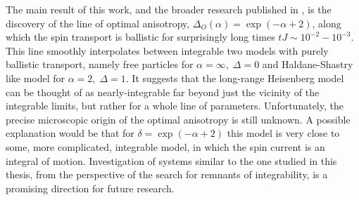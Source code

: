 The main result of this work, and the broader research published in \autocite{Mierzejewski2023}, is the
discovery of the line of optimal anisotropy, \(\Delta_{O}(\alpha) = \exp(-\alpha +2)\),
along which the spin transport is ballistic for surprisingly long times \(tJ \sim 10^{-2} -10^{-3}\).
This line smoothly interpolates between integrable two models with purely ballistic
transport, namely free particles for \(\alpha =\infty,\; \Delta =0\) and Haldane-Shastry
like model for \(\alpha  = 2,\; \Delta  = 1\). It suggests that the long-range Heisenberg
model can be thought of as nearly-integrable far beyond just the vicinity of the
integrable limits, but rather for a whole line of parameters. Unfortunately, the precise
microscopic origin of the optimal anisotropy is still unknown. A possible explanation
would be that for \(\delta = \exp(-\alpha  + 2)\) this model is very close to some,
more complicated, integrable model, in which the spin current is an integral of motion.
Investigation of systems similar to the one studied in this thesis, from the perspective
of the search for remnants of integrability, is a promising direction for future research.
